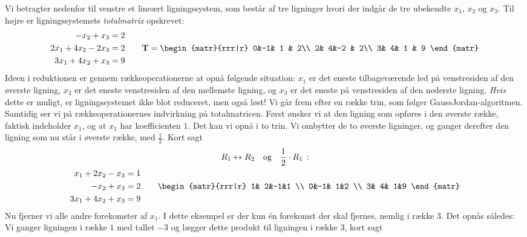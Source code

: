 \begin{example}\label{TN2.8}
Vi betragter nedenfor til venstre et lineært ligningssystem, som består af tre ligninger hvori der indgår de tre ubekendte $x_1$, $x_2$ og $x_3$. Til højre er ligningssystemets \textit{totalmatrix} opskrevet:
\begin{equation}\label{TN2.8b}
\begin{aligned}
-x_2 + x_3 &= 2\\
2x_1 + 4x_2 - 2x_3 &= 2\\
3x_1 + 4x_2 + x_3 &= 9
\end{aligned}
\quad \quad
\mathbf{T}=
\begin{matr}{rrr|r}
 0&-1& 1 & 2\\
 2& 4&-2 & 2\\
 3& 4& 1 & 9
 \end{matr}
\end{equation}
Ideen i reduktionen er gennem rækkeoperationerne at opnå følgende situation: $x_1$ er det eneste tilbageværende led på venstresiden af den øverste ligning, $x_2$ er det eneste venstresiden af den mellemste ligning, og $x_3$ er det eneste på venstresiden af den nederste ligning. \textit{Hvis} dette er muligt, er ligningssystemet ikke blot reduceret, men også løst! 
Vi går frem efter en række trin, som følger GaussJordan-algoritmen. Samtidig ser vi på rækkeoperationernes indvirk\-ning på totalmatricen.\bs
Først ønsker vi at den ligning som opføres i den øverste række, faktisk indeholder  $x_1$, og at $x_1$ har koefficienten $1$. Det kan vi opnå i to trin. Vi ombytter de to øverste ligninger, og ganger derefter den ligning som nu står i øverste række, med $\frac 1 2$. Kort sagt
\begin{equation}
\begin{gathered}
R_1\leftrightarrow R_2 \quad \mathrm{og}\quad \frac 1 2 \cdot R_1\,: \\
\begin{aligned}
x_1 + 2x_2 - x_3&=1\\
-x_2+x_3&=2 \\
3x_1+4x_2+x_3&=9
\end{aligned}
\quad \quad
\begin{matr}{rrr|r}
 1& 2&-1&1 \\
 0&-1& 1&2 \\
 3& 4& 1&9
\end{matr}
\end{gathered}
\end{equation}
Nu fjerner vi alle andre forekomster af $x_1$. I dette eksempel er der kun én forekomst der skal fjernes, nemlig i række $3$. Det opnås således: Vi ganger  ligningen i række $1$ med tallet $-3$ og lægger dette produkt til ligningen i række $3$, kort sagt

\end{example}
